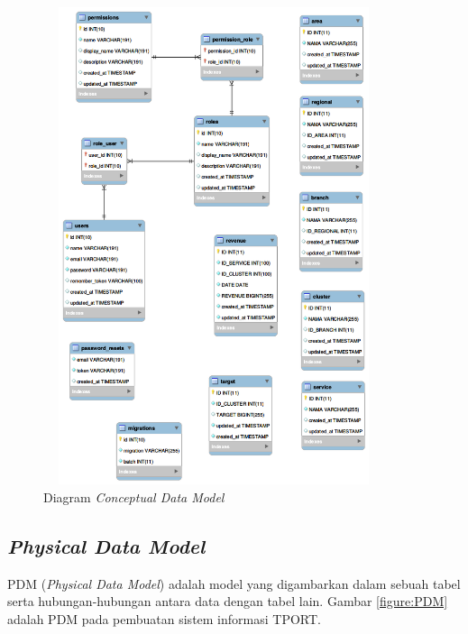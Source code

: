 	\begin{figure}[h!]
	\centerline
	{\includegraphics[width=10cm,height=14cm]{bab4/CDM.png}}
	\caption{Diagram \textit{Conceptual Data Model}}
	\label{figure:CDM}
	\end{figure}
	
\subsection{\textit{Physical Data Model}}
PDM (\textit{Physical Data Model}) adalah model yang digambarkan dalam sebuah tabel serta hubungan-hubungan antara data dengan tabel lain. Gambar \ref{figure:PDM} adalah PDM pada pembuatan sistem informasi TPORT.

